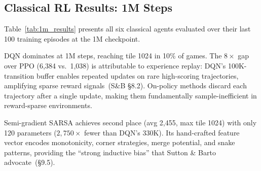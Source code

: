 \documentclass[letterpaper]{article}
\begin{document}
\subsection{Classical RL Results: 1M Steps}

Table~\ref{tab:1m_results} presents all six classical agents evaluated over their last 100 training episodes at the 1M checkpoint.

\begin{table}[t]
\centering
\caption{Classical agent performance at the 1M-step checkpoint, evaluated over the last 100 training episodes. DQN dominates across all metrics. Semi-gradient SARSA achieves second place with $2{,}750\times$ fewer parameters.}
\label{tab:1m_results}
\end{table}

DQN dominates at 1M steps, reaching tile 1024 in 10\% of games. The $8\times$ gap over PPO (6,384 vs.\ 1,038) is attributable to experience replay: DQN's 100K-transition buffer enables repeated updates on rare high-scoring trajectories, amplifying sparse reward signals~(S\&B \S8.2). On-policy methods discard each trajectory after a single update, making them fundamentally sample-inefficient in reward-sparse environments.

Semi-gradient SARSA achieves second place (avg 2,455, max tile 1024) with only 120 parameters ($2{,}750\times$ fewer than DQN's 330K). Its hand-crafted feature vector encodes monotonicity, corner strategies, merge potential, and snake patterns, providing the ``strong inductive bias'' that Sutton \& Barto advocate~(\S9.5).
\end{document}
